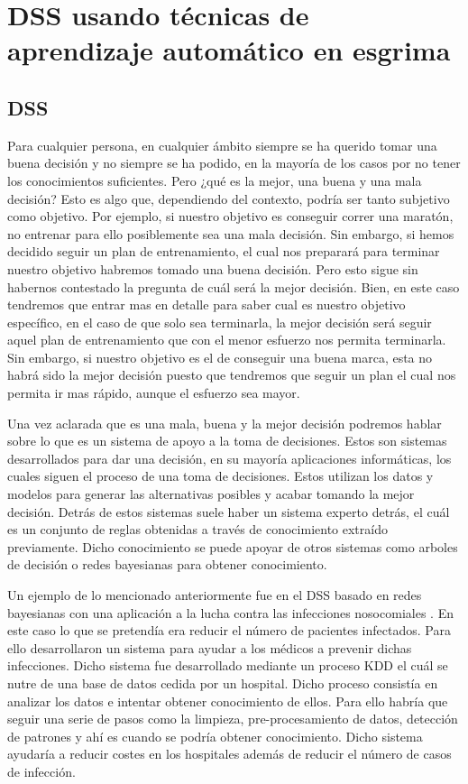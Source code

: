 \newline

\section{\acs{DSS} usando técnicas de aprendizaje automático en esgrima}
\subsection{\acl{DSS}}

Para cualquier persona, en cualquier ámbito siempre se ha querido tomar una buena decisión y no siempre se ha podido, en la mayoría de los casos
 por no tener los conocimientos suficientes. Pero ¿qué es la mejor, una buena y una mala decisión?
 Esto es algo que, dependiendo del contexto, podría ser tanto subjetivo como objetivo. Por ejemplo, si nuestro
 objetivo es conseguir correr una maratón, no entrenar para ello posiblemente sea una mala decisión.
 Sin embargo, si hemos decidido seguir un plan de entrenamiento, el cual nos preparará para terminar
 nuestro objetivo habremos tomado una buena decisión. Pero esto sigue sin habernos contestado la pregunta
 de cuál será la mejor decisión. Bien, en este caso tendremos que entrar mas en detalle para saber
 cual es nuestro objetivo específico, en el caso de que solo sea terminarla, la mejor decisión será seguir aquel
 plan de entrenamiento que con el menor esfuerzo nos permita terminarla. Sin embargo, si nuestro objetivo
 es el de conseguir una buena marca, esta no habrá sido la mejor decisión puesto que tendremos que
 seguir un plan el cual nos permita ir mas rápido, aunque el esfuerzo sea mayor.

Una vez aclarada que es una mala, buena y la mejor decisión podremos hablar sobre lo que es un sistema
 de apoyo a la toma de decisiones. Estos son sistemas desarrollados para dar una decisión, en su mayoría
 aplicaciones informáticas, los cuales siguen el proceso de una toma de decisiones. Estos utilizan
 los datos y modelos para generar las alternativas posibles y acabar tomando la mejor decisión. Detrás
 de estos sistemas suele haber un sistema experto detrás, el cuál es un conjunto de reglas obtenidas
 a través de conocimiento extraído previamente. Dicho conocimiento se puede apoyar de otros sistemas como
 arboles de decisión o redes bayesianas para obtener conocimiento.

Un ejemplo de lo mencionado anteriormente fue en el \acs{DSS} basado en redes bayesianas con una aplicación
 a la lucha contra las infecciones nosocomiales \cite{hela}. En este caso lo que se pretendía
 era reducir el número de pacientes infectados. Para ello desarrollaron un sistema para ayudar a los
 médicos a prevenir dichas infecciones. Dicho sistema fue desarrollado mediante un proceso \acf{KDD} el
 cuál se nutre de una base de datos cedida por un hospital. Dicho proceso consistía en analizar los datos
 e intentar obtener conocimiento de ellos. Para ello habría que seguir una serie de pasos como la
 limpieza, pre-procesamiento de datos, detección de patrones y ahí es cuando se podría obtener conocimiento.
 Dicho sistema ayudaría a reducir costes en los hospitales además de reducir el número de casos de infección.


